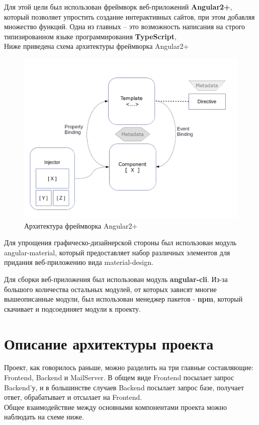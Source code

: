 \documentclass{article}
\begin{document}
Для этой цели был использован фреймворк веб-приложений \textbf{Angular2+}, который позволяет упростить создание интерактивных сайтов, при этом добавляя множество функций. Одна из главных -- это возможность написания на строго типизированном языке программирования \textbf{TypeScript}, \\

Ниже приведена схема архитектуры фреймворка Angular2+
\begin{figure}[H]
        \begin{flushleft}        \centerline{\includegraphics[scale=0.45]{angulararch.png}}
        \caption{Архитектура фреймворка Angular2+}
        \end{flushleft}
\end{figure}

Для упрощения графическо-дизайнерской стороны был использован модуль angular-material, который предоставляет набор различных элементов для придания веб-приложению вида material-design. 

Для сборки веб-приложения был использован модуль \textbf{angular-cli}.
Из-за большого количества остальных модулей, от которых зависят многие вышеописанные модули, был использован менеджер пакетов - \textbf{npm}, который скачивает и подсоединяет модули к проекту.

\section{Описание архитектуры проекта}
Проект, как говорилось раньше, можно разделить на три главные составляющие: Frontend, Backend и MailServer. В общем виде Frontend посылает запрос Backend'у, и в большинстве случаев Backend посылает запрос базе, получает ответ, обрабатывает и отсылает на Frontend. \\
Общее взаимодействие между основными компонентами проекта можно наблюдать на схеме ниже. 
\end{document}
